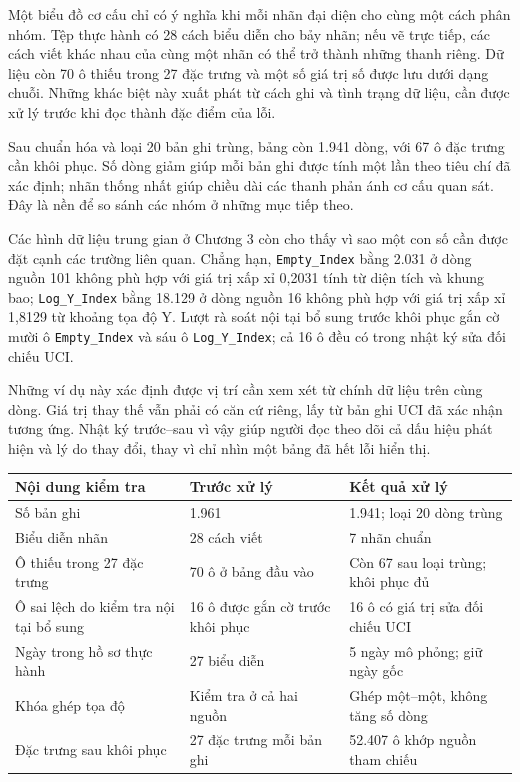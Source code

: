 \documentclass[12pt,a4paper,oneside]{report}
\newcommand{\maCot}[1]{{\urlstyle{tt}\def\UrlBreaks{\do\_\do\/\do\.}\def\UrlBigBreaks{}\nolinkurl{#1}}}
\begin{document}
Một biểu đồ cơ cấu chỉ có ý nghĩa khi mỗi nhãn đại diện cho cùng một cách phân nhóm. Tệp thực hành có 28 cách biểu diễn cho bảy nhãn; nếu vẽ trực tiếp, các cách viết khác nhau của cùng một nhãn có thể trở thành những thanh riêng. Dữ liệu còn 70 ô thiếu trong 27 đặc trưng và một số giá trị số được lưu dưới dạng chuỗi. Những khác biệt này xuất phát từ cách ghi và tình trạng dữ liệu, cần được xử lý trước khi đọc thành đặc điểm của lỗi.

Sau chuẩn hóa và loại 20 bản ghi trùng, bảng còn 1.941 dòng, với 67 ô đặc trưng cần khôi phục. Số dòng giảm giúp mỗi bản ghi được tính một lần theo tiêu chí đã xác định; nhãn thống nhất giúp chiều dài các thanh phản ánh cơ cấu quan sát. Đây là nền để so sánh các nhóm ở những mục tiếp theo.

Các hình dữ liệu trung gian ở Chương 3 còn cho thấy vì sao một con số cần được đặt cạnh các trường liên quan. Chẳng hạn, \maCot{Empty_Index} bằng 2.031 ở dòng nguồn 101 không phù hợp với giá trị xấp xỉ 0,2031 tính từ diện tích và khung bao; \maCot{Log_Y_Index} bằng 18.129 ở dòng nguồn 16 không phù hợp với giá trị xấp xỉ 1,8129 từ khoảng tọa độ Y. Lượt rà soát nội tại bổ sung trước khôi phục gắn cờ mười ô \maCot{Empty_Index} và sáu ô \maCot{Log_Y_Index}; cả 16 ô đều có trong nhật ký sửa đối chiếu UCI.

Những ví dụ này xác định được vị trí cần xem xét từ chính dữ liệu trên cùng dòng. Giá trị thay thế vẫn phải có căn cứ riêng, lấy từ bản ghi UCI đã xác nhận tương ứng. Nhật ký trước--sau vì vậy giúp người đọc theo dõi cả dấu hiệu phát hiện và lý do thay đổi, thay vì chỉ nhìn một bảng đã hết lỗi hiển thị.

\begin{center}\begin{minipage}{\linewidth}
\label{tab:ch4chatluong}
\small{}
\begin{tabularx}{\linewidth}{@{}Y p{3.1cm}p{3.1cm}@{}}
\toprule
Nội dung kiểm tra & Trước xử lý & Kết quả xử lý \\
\midrule
Số bản ghi & 1.961 & 1.941; loại 20 dòng trùng \\
Biểu diễn nhãn & 28 cách viết & 7 nhãn chuẩn \\
Ô thiếu trong 27 đặc trưng & 70 ô ở bảng đầu vào & Còn 67 sau loại trùng; khôi phục đủ \\
Ô sai lệch do kiểm tra nội tại bổ sung & 16 ô được gắn cờ trước khôi phục & 16 ô có giá trị sửa đối chiếu UCI \\
Ngày trong hồ sơ thực hành & 27 biểu diễn & 5 ngày mô phỏng; giữ ngày gốc \\
Khóa ghép tọa độ & Kiểm tra ở cả hai nguồn & Ghép một--một, không tăng số dòng \\
Đặc trưng sau khôi phục & 27 đặc trưng mỗi bản ghi & 52.407 ô khớp nguồn tham chiếu \\
\bottomrule
\end{tabularx}
\end{minipage}\end{center}
\end{document}
